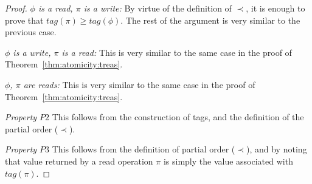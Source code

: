 \begin{proof}
\emph{ $\phi$ is a read, $\pi$ is a write:}
By virtue of the definition of $\prec$, it is enough to prove that $tag(\pi) \geq tag(\phi)$.  The rest of the argument is very similar to the previous case.

\emph{ $\phi$ is a write, $\pi$ is a read:}
This  is very similar to the same case in the proof of Theorem~\ref{thm:atomicity:treas}.


\emph{ $\phi$, $\pi$ are reads:}
This  is very similar to the same case in the proof of Theorem~\ref{thm:atomicity:treas}.

\emph{Property $P2$} This follows from the construction of tags, and the definition of the partial order ($\prec$).

\emph{Property $P3$} This follows from the definition of partial order ($\prec$), and by noting that value returned by a read operation $\pi$ is simply the value associated with $tag(\pi)$.
%
				\end{proof}
				
